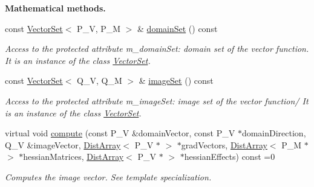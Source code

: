 \begin{Indent}{\bf Mathematical methods.}\par
\begin{DoxyCompactItemize}
\item 
const \hyperlink{class_q_u_e_s_o_1_1_vector_set}{Vector\-Set}$<$ P\-\_\-\-V, P\-\_\-\-M $>$ \& \hyperlink{class_q_u_e_s_o_1_1_base_vector_function_af77b709d473f253e5c56aa620d5f3cb0}{domain\-Set} () const 
\begin{DoxyCompactList}\small\item\em Access to the protected attribute {\ttfamily m\-\_\-domain\-Set\-:} domain set of the vector function. It is an instance of the class \hyperlink{class_q_u_e_s_o_1_1_vector_set}{Vector\-Set}. \end{DoxyCompactList}\item 
const \hyperlink{class_q_u_e_s_o_1_1_vector_set}{Vector\-Set}$<$ Q\-\_\-\-V, Q\-\_\-\-M $>$ \& \hyperlink{class_q_u_e_s_o_1_1_base_vector_function_aa3a070a86f7099f53a669f1aab547619}{image\-Set} () const 
\begin{DoxyCompactList}\small\item\em Access to the protected attribute {\ttfamily m\-\_\-image\-Set\-:} image set of the vector function/ It is an instance of the class \hyperlink{class_q_u_e_s_o_1_1_vector_set}{Vector\-Set}. \end{DoxyCompactList}\item 
virtual void \hyperlink{class_q_u_e_s_o_1_1_base_vector_function_a7ecf6f9270dfd96812074c7ab4badd6e}{compute} (const P\-\_\-\-V \&domain\-Vector, const P\-\_\-\-V $\ast$domain\-Direction, Q\-\_\-\-V \&image\-Vector, \hyperlink{class_q_u_e_s_o_1_1_dist_array}{Dist\-Array}$<$ P\-\_\-\-V $\ast$ $>$ $\ast$grad\-Vectors, \hyperlink{class_q_u_e_s_o_1_1_dist_array}{Dist\-Array}$<$ P\-\_\-\-M $\ast$ $>$ $\ast$hessian\-Matrices, \hyperlink{class_q_u_e_s_o_1_1_dist_array}{Dist\-Array}$<$ P\-\_\-\-V $\ast$ $>$ $\ast$hessian\-Effects) const =0
\begin{DoxyCompactList}\small\item\em Computes the image vector. See template specialization. \end{DoxyCompactList}\end{DoxyCompactItemize}
\end{Indent}
